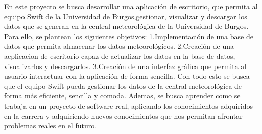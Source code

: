 
En este proyecto se busca desarrollar una aplicación de escritorio, que permita al equipo Swift de la Universidad de Burgos,gestionar, visualizar y descargar los datos que se generan en la central meteorológica de la Universidad de Burgos. Para ello, se plantean los siguientes objetivos:\newline\newline 
1.Implementación de una base de datos que permita almacenar los datos meteorológicos.  \newline
2.Creación de una acplicacion de escritorio capaz de actualizar los datos en la base de datos, visualizarlos y descargarlos.\newline
3.Creación de una interfaz gráfica que permita al usuario interactuar con la aplicación de forma sencilla.\newline\newline
Con todo esto se busca que el equipo Swift pueda gestionar los datos de la central meteorológica de forma más eficiente, sencilla y comoda.\newline
Ademas, se busca aprender como se trabaja en un proyecto de software real, aplicando los conocimientos adquiridos en la carrera y adquiriendo nuevos conocimientos que nos permitan afrontar problemas reales en el futuro.\newline

